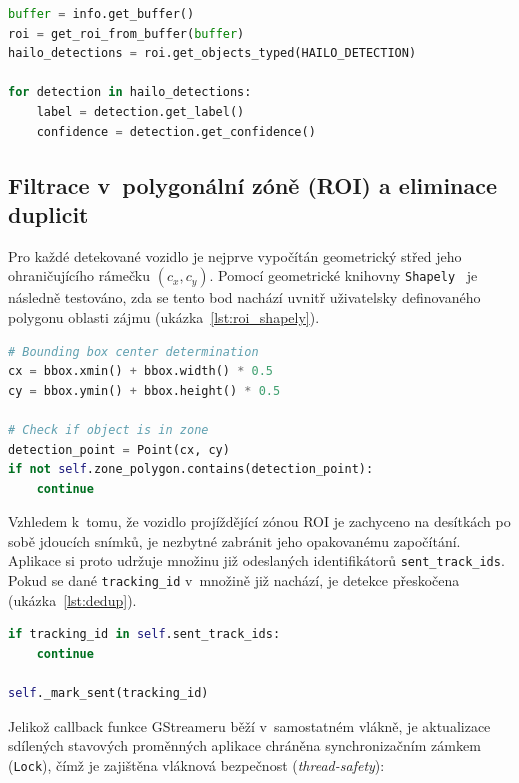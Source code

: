 \begin{lstlisting}[language=Python, caption={Extrakce detekčních metadat z~GStreamer bufferu.}, label={lst:meta_extract}]
buffer = info.get_buffer()
roi = get_roi_from_buffer(buffer)
hailo_detections = roi.get_objects_typed(HAILO_DETECTION)

for detection in hailo_detections:
    label = detection.get_label()
    confidence = detection.get_confidence()
\end{lstlisting}

\subsection{Filtrace v~polygonální zóně (ROI) a eliminace duplicit}
Pro každé detekované vozidlo je nejprve vypočítán geometrický střed jeho ohraničujícího rámečku $(c_x, c_y)$. Pomocí geometrické knihovny \texttt{Shapely}~\cite{shapely_docs} je následně testováno, zda se tento bod nachází uvnitř uživatelsky definovaného polygonu oblasti zájmu (ukázka~\ref{lst:roi_shapely}).

\begin{lstlisting}[language=Python, caption={Filtrace detekcí v~definované polygonální ROI zóně.}, label={lst:roi_shapely}]
# Bounding box center determination
cx = bbox.xmin() + bbox.width() * 0.5
cy = bbox.ymin() + bbox.height() * 0.5

# Check if object is in zone
detection_point = Point(cx, cy)
if not self.zone_polygon.contains(detection_point):
    continue
\end{lstlisting}

Vzhledem k~tomu, že vozidlo projíždějící zónou ROI je zachyceno na desítkách po sobě jdoucích snímků, je nezbytné zabránit jeho opakovanému započítání. Aplikace si proto udržuje množinu již odeslaných identifikátorů \texttt{sent\_track\_ids}. Pokud se dané \texttt{tracking\_id} v~množině již nachází, je detekce přeskočena (ukázka~\ref{lst:dedup}).

\begin{lstlisting}[language=Python, caption={Prevence duplicitního odeslání téhož vozidla.}, label={lst:dedup}]
if tracking_id in self.sent_track_ids:
    continue

self._mark_sent(tracking_id)
\end{lstlisting}

Jelikož callback funkce GStreameru běží v~samostatném vlákně, je aktualizace sdílených stavových proměnných aplikace chráněna synchronizačním zámkem (\texttt{Lock}), čímž je zajištěna vláknová bezpečnost (\textit{thread-safety}):

